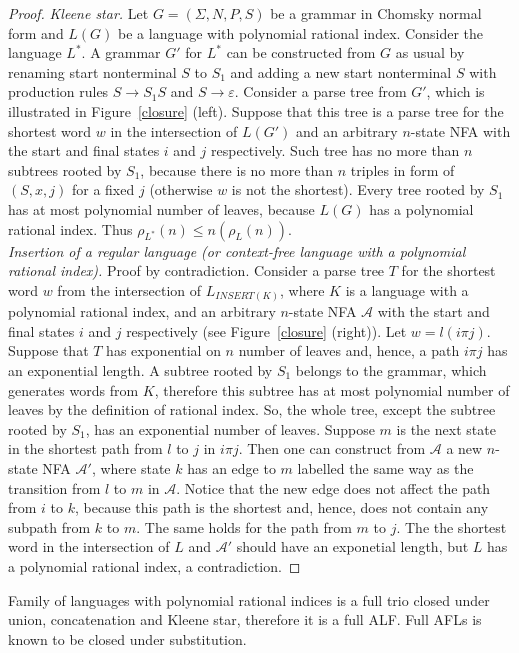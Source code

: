 \begin{proof}

\textit{Kleene star.} Let $G = (\Sigma, N, P, S)$ be a grammar in Chomsky normal form and $L(G)$ be a language with polynomial rational index. Consider the language $L^{*}$. A grammar $G'$ for $L^{*}$ can be constructed from $G$ as usual by renaming start nonterminal $S$ to $S_1$ and adding a new start nonterminal $S$ with production rules $S \rightarrow S_1S$ and $S \rightarrow \varepsilon$. Consider a parse tree from $G'$, which is illustrated in Figure~\ref{closure} (left). Suppose that this tree is a parse tree for the shortest word $w$ in the intersection of $L(G')$ and an arbitrary $n$-state NFA with the start and final states $i$ and $j$ respectively. Such tree has no more than $n$ subtrees rooted by $S_1$, because there is no more than $n$ triples in form of $(S, x, j)$ for a fixed $j$ (otherwise $w$ is not the shortest). Every tree rooted by $S_1$ has at most polynomial number of leaves, because $L(G)$ has a polynomial rational index. Thus $\rho_{L^{*}}(n) \le n(\rho_L(n))$.
\\
\textit{Insertion of a regular language (or context-free language with a polynomial rational index).} Proof by contradiction. Consider a parse tree $T$ for the shortest word $w$ from the intersection of $L_{INSERT(K)}$, where $K$ is a language with a polynomial rational index, and an arbitrary $n$-state NFA $\mathcal{A}$ with the start and final states $i$ and $j$ respectively (see Figure~\ref{closure} (right)). Let $w = l(i \pi j)$. Suppose that $T$ has exponential on $n$ number of leaves and, hence, a path $i \pi j$ has an exponential length. A subtree rooted by $S_1$ belongs to the grammar, which generates words from $K$, therefore this subtree has at most polynomial number of leaves by the definition of rational index. So, the whole tree, except the subtree rooted by $S_1$, has an exponential number of leaves. Suppose $m$ is the next state in the shortest path from $l$ to $j$ in $i \pi j$. Then one can construct from $\mathcal{A}$ a new $n$-state NFA $\mathcal{A'}$, where state $k$ has an edge to $m$ labelled the same way as the transition from $l$ to $m$ in $\mathcal{A}$. Notice that the new edge does not affect the path from $i$ to $k$, because this path is the shortest and, hence, does not contain any subpath from $k$ to $m$. The same holds for the path from $m$ to $j$. The the shortest word in the intersection of $L$ and $\mathcal{A'}$ should have an exponetial length, but $L$ has a polynomial rational index, a contradiction.

\end{proof}
Family of languages with polynomial rational indices is a full trio closed under union, concatenation and Kleene star, therefore it is a full ALF. Full AFLs is known to be closed under substitution.



